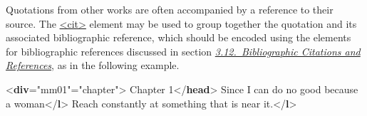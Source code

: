 Quotations from other works are often accompanied by a reference to their source. The \hyperref[TEI.cit]{<cit>} element may be used to group together the quotation and its associated bibliographic reference, which should be encoded using the elements for bibliographic references discussed in section \textit{\hyperref[COBI]{3.12.\ Bibliographic Citations and References}}, as in the following example. \par\bgroup{}\exampleFont \begin{shaded}\noindent\mbox{}{<\textbf{div}\hspace*{1em}{xml:id}="{mm01}"\hspace*{1em}{type}="{chapter}">}\mbox{}\newline 
{}Chapter 1{</\textbf{head}>}\mbox{}\newline 
{}\mbox{}\newline 
\hspace*{1em}\mbox{}\newline 
\hspace*{1em}\hspace*{1em}\mbox{}\newline 
\hspace*{1em}\hspace*{1em}\hspace*{1em}Since I can do no good because a woman{</\textbf{l}>}\mbox{}\newline 
\hspace*{1em}\hspace*{1em}\hspace*{1em}Reach constantly at something that is near it.{</\textbf{l}>}\mbox{}\newline 
\hspace*{1em}\hspace*{1em}\mbox{}\newline 

\end{shaded}
